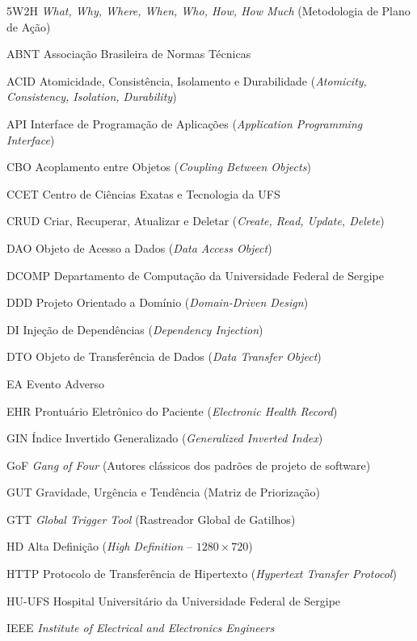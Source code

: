 \begin{siglas}
    \item[5W2H] \textit{What, Why, Where, When, Who, How, How Much} (Metodologia de Plano de Ação)
    \item[ABNT] Associação Brasileira de Normas Técnicas
    \item[ACID] Atomicidade, Consistência, Isolamento e Durabilidade (\textit{Atomicity, Consistency, Isolation, Durability})
    \item[API] Interface de Programação de Aplicações (\textit{Application Programming Interface})
    \item[CBO] Acoplamento entre Objetos (\textit{Coupling Between Objects})
    \item[CCET] Centro de Ciências Exatas e Tecnologia da UFS
    \item[CRUD] Criar, Recuperar, Atualizar e Deletar (\textit{Create, Read, Update, Delete})
    \item[DAO] Objeto de Acesso a Dados (\textit{Data Access Object})
    \item[DCOMP] Departamento de Computação da Universidade Federal de Sergipe
    \item[DDD] Projeto Orientado a Domínio (\textit{Domain-Driven Design})
    \item[DI] Injeção de Dependências (\textit{Dependency Injection})
    \item[DTO] Objeto de Transferência de Dados (\textit{Data Transfer Object})
    \item[EA] Evento Adverso
    \item[EHR] Prontuário Eletrônico do Paciente (\textit{Electronic Health Record})
    \item[GIN] Índice Invertido Generalizado (\textit{Generalized Inverted Index})
    \item[GoF] \textit{Gang of Four} (Autores clássicos dos padrões de projeto de software)
    \item[GUT] Gravidade, Urgência e Tendência (Matriz de Priorização)
    \item[GTT] \textit{Global Trigger Tool} (Rastreador Global de Gatilhos)
    \item[HD] Alta Definição (\textit{High Definition} -- $1280 \times 720$)
    \item[HTTP] Protocolo de Transferência de Hipertexto (\textit{Hypertext Transfer Protocol})
    \item[HU-UFS] Hospital Universitário da Universidade Federal de Sergipe
    \item[IEEE] \textit{Institute of Electrical and Electronics Engineers}

\end{siglas}
